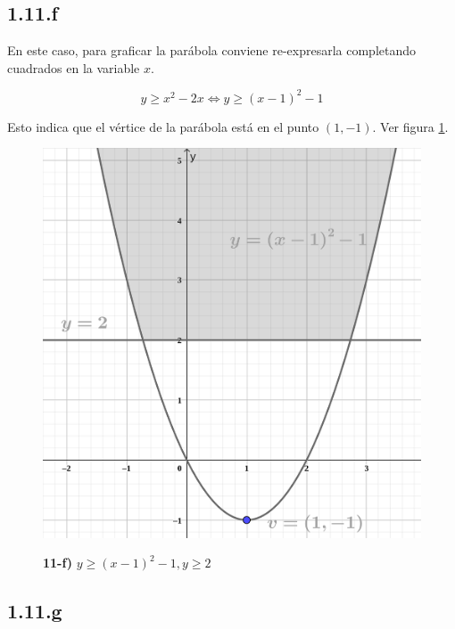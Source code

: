 \documentclass{article}
\begin{document}
\subsection*{1.11.f}
\label{subsec:1.11.f}

En este caso, para graficar la parábola conviene re-expresarla completando cuadrados en la variable $x$.

\begin{equation}
y \geq x^2 - 2x \Leftrightarrow y \geq (x-1)^2 - 1
\end{equation}

Esto indica que el vértice de la parábola está en el punto $(1, -1)$. Ver figura \ref{fig:1-11-f}.

\begin{figure}[ht]
\caption{\textbf{11-f)} $y \geq (x-1)^2 - 1, y \geq 2$}
\includegraphics[scale=0.75]{../img/exercises/guide_01/11_f.png} 
\centering
\label{fig:1-11-f}
\end{figure}

\subsection*{1.11.g}
\label{subsec:1.11.g}
\end{document}
